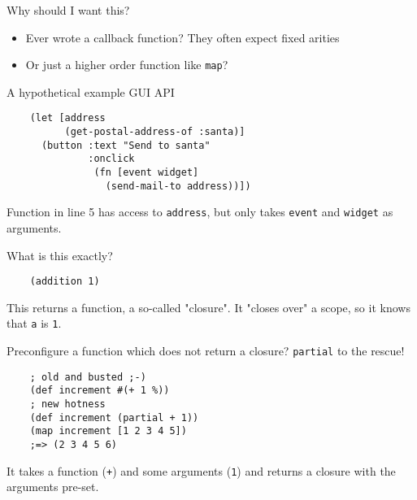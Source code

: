 \begin{frame}
  Why should I want this?
  \begin{itemize}
    \item Ever wrote a callback function? They often expect fixed arities
    \item Or just a higher order function like \texttt{map}?
  \end{itemize}
\end{frame}

\begin{frame}[fragile]
  A hypothetical example GUI API
  \begin{verbatim}
    (let [address
          (get-postal-address-of :santa)]
      (button :text "Send to santa"
              :onclick
               (fn [event widget]
                 (send-mail-to address))])
  \end{verbatim}
  Function in line 5 has access to \texttt{address}, but only takes
  \texttt{event} and \texttt{widget} as arguments.
\end{frame}

\begin{frame}[fragile]
  What is this exactly?
  \begin{verbatim}
    (addition 1)
  \end{verbatim}
  This returns a function, a so-called "closure". It "closes over" a scope, so
  it knows that \texttt{a} is \texttt{1}.
\end{frame}


\begin{frame}[fragile]
  Preconfigure a function which does not return a closure? \texttt{partial}
  to the rescue!
  \begin{verbatim}
    ; old and busted ;-)
    (def increment #(+ 1 %))
    ; new hotness
    (def increment (partial + 1))
    (map increment [1 2 3 4 5])
    ;=> (2 3 4 5 6)
  \end{verbatim}
  It takes a function (\texttt{+}) and some arguments (\texttt{1}) and
  returns a closure with the arguments pre-set.
\end{frame}





